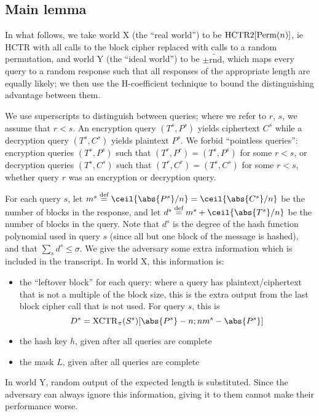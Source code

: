 \documentclass[hctr.tex]{subfiles}
\begin{document}
\subsection{Main lemma}\label{mainlemma}
In what follows, we take world X (the ``real world'') 
to be \(\operatorname{HCTR2}[\operatorname{Perm}(n)]\),
ie HCTR with all calls to the block cipher
replaced with calls to a random permutation,
and world Y (the ``ideal world'') to be \(\pm\widetilde{\mathrm{rnd}}\),
which maps every query to a random response such that
all responses of the appropriate length are equally likely;
we then use the H-coefficient technique to bound
the distinguishing advantage between them.

We use superscripts to distinguish between queries;
where we refer to \(r\), \(s\), we assume that \(r < s\).
An encryption query \((T^s, P^s)\) yields ciphertext \(C^s\)
while a decryption query \((T^s, C^s)\)
yields plaintext \(P^s\).
We forbid ``pointless queries'':
encryption queries \((T^s, P^s)\)
such that \((T^r, P^r) = (T^s, P^s)\) for some \(r < s\), 
or decryption queries \((T^s, C^s)\)
such that \((T^r, C^r) = (T^s, C^s)\) for some \(r < s\),
whether query \(r\) was an encryption or decryption query.

For each query \(s\), 
let \(m^s \defeq \ceil{\abs{P^s}/n} = \ceil{\abs{C^s}/n}\)
be the number of blocks in the response,
and let \(d^s \defeq m^s + \ceil{\abs{T^s}/n}\)
be the number of blocks in the query.
Note that \(d^s\) is the degree of the hash
function polynomial used in query \(s\)
(since all but one block of the message is hashed),
and that \(\sum_s d^s \leq \sigma\).
We give the adversary some extra information
which is included in the transcript.
In world X, this information is:
\begin{itemize}
    \item the ``leftover block'' for each query:
    where a query has plaintext/ciphertext
    that is not a multiple of the block size,
    this is the extra output from the last
    block cipher call that is not used.
    For query \(s\), this is 
    \begin{displaymath}
        D^s = \XCTR_\pi(S^s)[\abs{P^s} - n; nm^s-\abs{P^s}]
    \end{displaymath}
    \item the hash key \(h\), given after all queries are complete
    \item the mask \(L\), given after all queries are complete
\end{itemize}
In world Y, random output of the expected
length is substituted. Since the adversary can always ignore
this information, giving it to them cannot make their performance worse.
\end{document}
